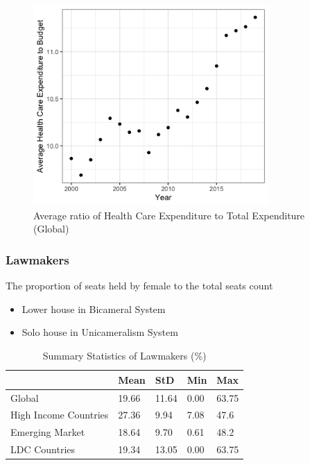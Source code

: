 \documentclass[12pt]{beamer}
\begin{document}
\begin{frame}[plain]
\begin{figure}
\centering
\includegraphics[width=0.8\textwidth]{figure/HealthCare_Point.png}	
\caption{Average ratio of Health Care Expenditure to Total Expenditure (Global)}
\end{figure}
\end{frame}

\begin{frame}
	\frametitle{Lawmakers}
	\begin{center}
	\alert{The proportion of seats held by female to the total seats count}	
\end{center}
	\begin{itemize}
		\item Lower house in Bicameral System
		\item Solo house in Unicameralism System
	\end{itemize}
	
	\begin{table}
\centering
\begin{tabular}{lllll} 
\hline
                     & Mean  & StD  & Min  & Max   \\ 
\hline
Global         & 19.66 & 11.64 & 0.00 & 63.75  \\
High Income Countries  & 27.36 & 9.94 & 7.08 & 47.6  \\
Emerging Market & 18.64  & 9.70 & 0.61 & 48.2  \\
LDC Countries   & 19.34 & 13.05 & 0.00 & 63.75 \\
\hline
\end{tabular}
\caption{Summary Statistics of Lawmakers (\%)}
\label{Health Care Summary}
\end{table}
\end{frame}
\end{document}
